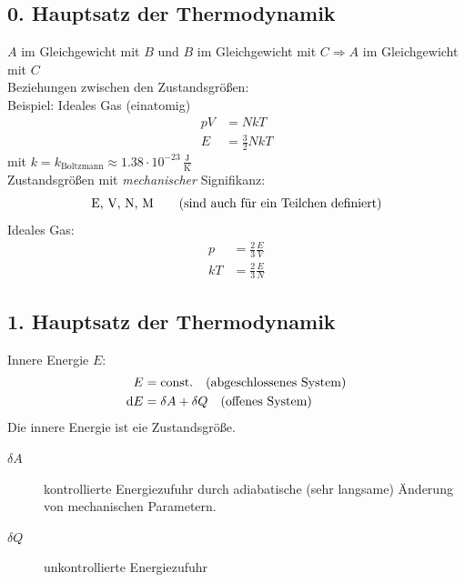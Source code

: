 \subsection{0. Hauptsatz der Thermodynamik}
$A$ im Gleichgewicht mit $B$ und $B$ im Gleichgewicht mit $C \Rightarrow A$ im Gleichgewicht mit $C$ \\
Beziehungen zwischen den Zustandsgrößen: \\
Beispiel: Ideales Gas (einatomig)
\begin{equation}
    \begin{split}
        p V &= N k T \\
        E &= \frac{3}{2} N k T
    \end{split}
\end{equation}
mit $k=k_\text{Boltzmann} \approx 1.38\cdot 10^{-23}\,\frac{\text{J}}{\text{K}}$ \\
Zustandsgrößen mit \emph{mechanischer} Signifikanz:
\begin{equation}
    $E, V, N, M$ \qquad \text{(sind auch für ein Teilchen definiert)}
\end{equation}
Ideales Gas:
\begin{equation}
    \begin{split}
        p &= \frac{2}{3} \frac{E}{V} \\
        k T &= \frac{2}{3} \frac{E}{N}
    \end{split}
\end{equation}
\subsection{1. Hauptsatz der Thermodynamik}
Innere Energie $E$:
\begin{equation}
    \begin{split}
        E&=\text{const.} \quad \text{(abgeschlossenes System)} \\
        \mathrm{d} E &= \delta A + \delta Q \quad \text{(offenes System)}
    \end{split}
\end{equation}
Die innere Energie ist eie Zustandsgröße.
\begin{description}
    \item[$\delta A$] kontrollierte Energiezufuhr durch adiabatische (sehr langsame) Änderung von mechanischen Parametern.
    \item[$\delta Q$] unkontrollierte Energiezufuhr
\end{description}

